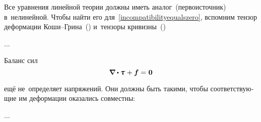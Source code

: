 \begin{otherlanguage}{russian}
Все уравнения линейной теории должны иметь аналог~(перво\-источ\-ник) в~нелинейной. Чтобы найти его для~\eqref{incompatibilityequalszero}, вспомним тензор деформации Коши\hbox{--}Грина~() и~тензоры кривизны~()

...





Баланс сил
\nopagebreak\vspace{-0.32em}\begin{equation}\label{balanceofforces}
\boldnabla \dotp \mathboldtau \hspace{0.15ex} + \bm{f} = \hspace{0.1ex} \bm{0}
\end{equation}

\vspace{-0.5em} \noindent ещё не~определяет напряжений. Они должны быть такими, чтобы соответствующие им деформации оказались совместны:

...







\end{otherlanguage}
